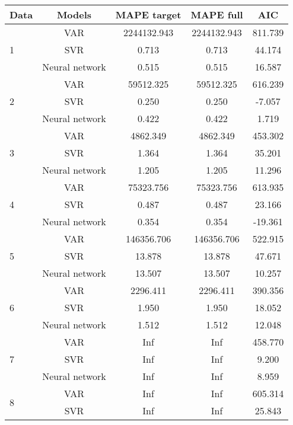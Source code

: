 \documentclass[12pt]{article}
\begin{document}
\begin{longtable}{|p{2cm}|c|c|c|c|}
\hline
Data & Models &MAPE target & MAPE full & AIC\\
\hline
\multirow{3}{*}{1} &VAR &   2244132.943 &    2244132.943 &    811.739\\
\cline{2-5}
 &SVR &   0.713 &    0.713 &    44.174\\
\cline{2-5}
 &Neural network &   0.515 &    0.515 &    16.587\\
\cline{2-5}
\hline
\multirow{3}{*}{2} &VAR &   59512.325 &    59512.325 &    616.239\\
\cline{2-5}
 &SVR &   0.250 &    0.250 &    -7.057\\
\cline{2-5}
 &Neural network &   0.422 &    0.422 &    1.719\\
\cline{2-5}
\hline
\multirow{3}{*}{3} &VAR &   4862.349 &    4862.349 &    453.302\\
\cline{2-5}
 &SVR &   1.364 &    1.364 &    35.201\\
\cline{2-5}
 &Neural network &   1.205 &    1.205 &    11.296\\
\cline{2-5}
\hline
\multirow{3}{*}{4} &VAR &   75323.756 &    75323.756 &    613.935\\
\cline{2-5}
 &SVR &   0.487 &    0.487 &    23.166\\
\cline{2-5}
 &Neural network &   0.354 &    0.354 &    -19.361\\
\cline{2-5}
\hline
\multirow{3}{*}{5} &VAR &   146356.706 &    146356.706 &    522.915\\
\cline{2-5}
 &SVR &   13.878 &    13.878 &    47.671\\
\cline{2-5}
 &Neural network &   13.507 &    13.507 &    10.257\\
\cline{2-5}
\hline
\multirow{3}{*}{6} &VAR &   2296.411 &    2296.411 &    390.356\\
\cline{2-5}
 &SVR &   1.950 &    1.950 &    18.052\\
\cline{2-5}
 &Neural network &   1.512 &    1.512 &    12.048\\
\cline{2-5}
\hline
\multirow{3}{*}{7} &VAR &   Inf &    Inf &    458.770\\
\cline{2-5}
 &SVR &   Inf &    Inf &    9.200\\
\cline{2-5}
 &Neural network &   Inf &    Inf &    8.959\\
\cline{2-5}
\hline
\multirow{3}{*}{8} &VAR &   Inf &    Inf &    605.314\\
\cline{2-5}
 &SVR &   Inf &    Inf &    25.843\\

\end{longtable}
\end{document}

